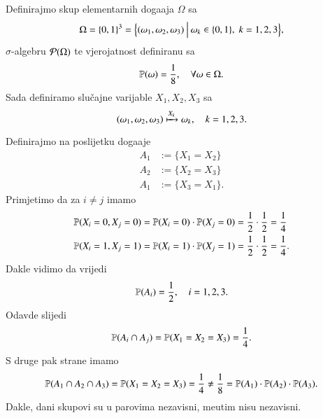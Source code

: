 \begin{rj}[\ref{zad:6.4}]
    Definirajmo skup elementarnih doga\dj aja $\Omega$ sa
    \begin{equation*}
        \Omega = \{0, 1\}^3 = \Big\{ {(\omega_1, \omega_2, \omega_3)} \: \Big| \: {\omega_k \in \{0, 1\}, \;  k = 1, 2, 3} \Big\},
    \end{equation*}
    $\sigma$-algebru $\mathcal{P}({\Omega})$ te vjerojatnost definiranu sa
    \begin{equation*}
        \mathbb{P} (\omega) = \frac{1}{8}, \quad \forall \omega \in \Omega.
    \end{equation*}
    Sada definiramo slu\v cajne varijable $X_1, X_2, X_3$ sa
    \begin{equation*}
        (\omega_1, \omega_2, \omega_3) \xmapsto{X_k} \omega_k, \quad k = 1, 2, 3.
    \end{equation*}

    Definirajmo na poslijetku doga\dj aje
    \begin{equation*}
        \begin{aligned}
            A_1 &:= \{ X_1 = X_2 \}\\
            A_2 &:= \{ X_2 = X_3 \}\\
            A_1 &:= \{ X_3 = X_1 \}.
        \end{aligned}
    \end{equation*}
    Primjetimo da za $i \neq j$ imamo
    \begin{equation*}
        \begin{aligned}
            \mathbb{P} (X_i = 0, X_j = 0) &= \mathbb{P} (X_i = 0) \cdot \mathbb{P} (X_j = 0) = \frac{1}{2} \cdot \frac{1}{2} = \frac{1}{4}\\
            \mathbb{P} (X_i = 1, X_j = 1) &= \mathbb{P} (X_i = 1) \cdot \mathbb{P} (X_j = 1) = \frac{1}{2} \cdot \frac{1}{2} = \frac{1}{4}.
        \end{aligned}
    \end{equation*}
    Dakle vidimo da vrijedi
    \begin{equation*}
        \mathbb{P} (A_i) = \frac{1}{2}, \quad i = 1, 2, 3.
    \end{equation*}
    Odavde slijedi
    \begin{equation*}
        \mathbb{P} (A_i \cap A_j) = \mathbb{P} (X_1 = X_2 = X_3) = \frac{1}{4}.
    \end{equation*}
    S druge pak strane imamo
    \begin{equation*}
        \mathbb{P} (A_1 \cap A_2 \cap A_3) = \mathbb{P} (X_1 = X_2 = X_3) = \frac{1}{4} \neq \frac{1}{8} = \mathbb{P} (A_1) \cdot \mathbb{P} (A_2) \cdot \mathbb{P} (A_3).
    \end{equation*}
    Dakle, dani skupovi su u parovima nezavisni, me\dj utim nisu nezavisni.
\end{rj}

